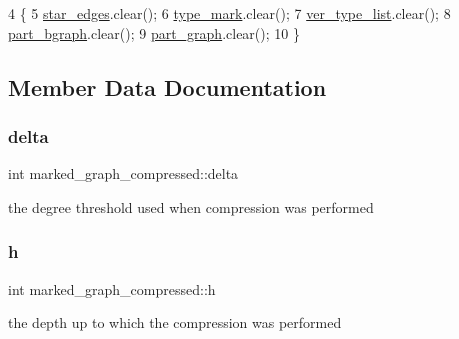\begin{DoxyCode}
4 \{
5   \hyperlink{classmarked__graph__compressed_a7df5779d313486644132bd816937f532}{star\_edges}.clear();
6   \hyperlink{classmarked__graph__compressed_a86b00223525703e973415cbc9c94da68}{type\_mark}.clear();
7   \hyperlink{classmarked__graph__compressed_af2e3e55223d436628a02758dfae88493}{ver\_type\_list}.clear();
8   \hyperlink{classmarked__graph__compressed_a7b3267063fba30b45eb21b3ba4e07536}{part\_bgraph}.clear();
9   \hyperlink{classmarked__graph__compressed_ae179a4737e6eab905c18a94d44ef64b7}{part\_graph}.clear();
10 \}
\end{DoxyCode}


\subsection{Member Data Documentation}
\mbox{\label{classmarked__graph__compressed_a8b2aaac68e9332ddc78d88eb60b323a7}} 
\subsubsection{\texorpdfstring{delta}{delta}}
{\footnotesize\ttfamily int marked\+\_\+graph\+\_\+compressed\+::delta}



the degree threshold used when compression was performed 

\mbox{\label{classmarked__graph__compressed_af6ff623407b673d08d0cab77b39c2193}} 
\subsubsection{\texorpdfstring{h}{h}}
{\footnotesize\ttfamily int marked\+\_\+graph\+\_\+compressed\+::h}



the depth up to which the compression was performed 

\mbox{\label{classmarked__graph__compressed_a8d841016ddb11cfd33748c8deb6277ba}} 
